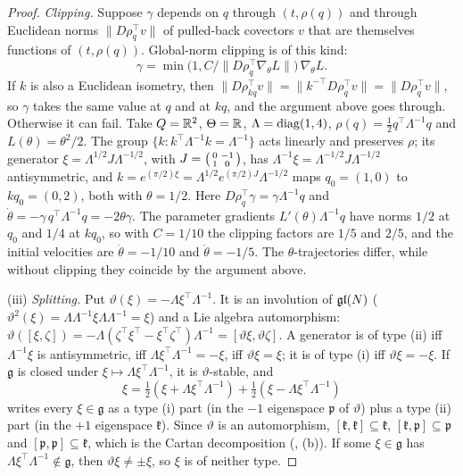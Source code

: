 \begin{proof}
\emph{Clipping.} Suppose $\gamma$ depends on $q$ through $(t,\rho(q))$ and through Euclidean norms
$\lVert D\rho_q^\top v\rVert$ of pulled-back covectors $v$ that are themselves functions of $(t,\rho(q))$. Global-norm
clipping is of this kind:
\[\gamma=\min\big(1,C/\lVert D\rho_q^\top\nabla_\theta L\rVert\big)\,\nabla_\theta L .\]
If $k$ is also a Euclidean isometry, then
$\lVert D\rho_{kq}^\top v\rVert=\lVert k^{-\top}D\rho_q^\top v\rVert=\lVert D\rho_q^\top v\rVert$, so $\gamma$ takes the
same value at $q$ and at $kq$, and the argument above goes through. Otherwise it can fail. Take $Q=\mathbb{R}^2$,
$\Theta=\mathbb{R}$, $\Lambda=\operatorname{diag}(1,4)$, $\rho(q)=\tfrac12q^\top\Lambda^{-1}q$ and $L(\theta)=\theta^2/2$. The group
$\{k:k^\top\Lambda^{-1}k=\Lambda^{-1}\}$ acts linearly and preserves $\rho$; its generator $\xi=\Lambda^{1/2}J\Lambda^{-1/2}$,
with $J=\begin{psmallmatrix}0&-1\\1&0\end{psmallmatrix}$, has $\Lambda^{-1}\xi=\Lambda^{-1/2}J\Lambda^{-1/2}$
antisymmetric, and $k=e^{(\pi/2)\xi}=\Lambda^{1/2}e^{(\pi/2)J}\Lambda^{-1/2}$ maps $q_0=(1,0)$ to $kq_0=(0,2)$, both with
$\theta=1/2$. Here $D\rho_q^\top\gamma=\gamma\Lambda^{-1}q$ and $\dot\theta=-\gamma\,q^\top\Lambda^{-1}q=-2\theta\gamma$.
The parameter gradients $L'(\theta)\Lambda^{-1}q$ have norms $1/2$ at $q_0$ and $1/4$ at $kq_0$, so with $C=1/10$ the
clipping factors are $1/5$ and $2/5$, and the initial velocities are $\dot\theta=-1/10$ and $\dot\theta=-1/5$. The
$\theta$-trajectories differ, while without clipping they coincide by the argument above.

(iii) \emph{Splitting.} Put $\vartheta(\xi)=-\Lambda\xi^\top\Lambda^{-1}$. It is an involution of $\mathfrak{gl}(N)$
($\vartheta^2(\xi)=\Lambda\Lambda^{-1}\xi\Lambda\Lambda^{-1}=\xi$) and a Lie algebra automorphism:
$\vartheta([\xi,\zeta])=-\Lambda(\zeta^\top\xi^\top-\xi^\top\zeta^\top)\Lambda^{-1}=[\vartheta\xi,\vartheta\zeta]$. A
generator is of type (ii) iff $\Lambda^{-1}\xi$ is antisymmetric, iff $\Lambda\xi^\top\Lambda^{-1}=-\xi$, iff
$\vartheta\xi=\xi$; it is of type (i) iff $\vartheta\xi=-\xi$. If $\mathfrak g$ is closed under
$\xi\mapsto\Lambda\xi^\top\Lambda^{-1}$, it is $\vartheta$-stable, and
\[\xi=\tfrac12(\xi+\Lambda\xi^\top\Lambda^{-1})+\tfrac12(\xi-\Lambda\xi^\top\Lambda^{-1})\]
writes every $\xi\in\mathfrak g$ as a type (i) part (in the $-1$ eigenspace $\mathfrak p$ of $\vartheta$) plus a type (ii)
part (in the $+1$ eigenspace $\mathfrak k$). Since $\vartheta$ is an automorphism, $[\mathfrak k,\mathfrak k]\subseteq\mathfrak k$,
$[\mathfrak k,\mathfrak p]\subseteq\mathfrak p$ and $[\mathfrak p,\mathfrak p]\subseteq\mathfrak k$, which is the Cartan
decomposition (, (b)). If some $\xi\in\mathfrak g$ has $\Lambda\xi^\top\Lambda^{-1}\notin\mathfrak g$, then
$\vartheta\xi\ne\pm\xi$, so $\xi$ is of neither type.


\end{proof}
